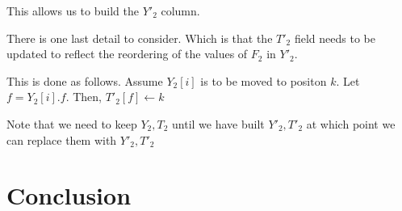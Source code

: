 \documentclass[12pt,letterpaper]{article}
\begin{document}
This allows us to build the \(Y'_2\) column. 
\item 
There is one last detail to consider. Which is that the \(T'_2\) field needs to
be updated to reflect the reordering of the values of \(F_2\) in \(Y'_2\).

This is done as follows. Assume \(Y_2[i]\) is to be moved to positon \(k\). Let
\(f = Y_2[i].f\). Then, \(T'_2[f] \leftarrow k\)
\ee

Note that we need to keep \(Y_2, T_2\) until we have built \(Y'_2, T'_2\) at
which point we can replace them with \(Y'_2, T'_2\)



\section{Conclusion}



\end{document}
